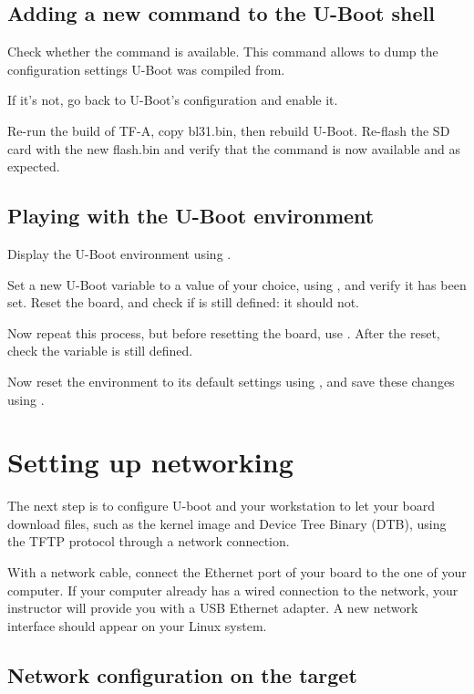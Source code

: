 \subsection{Adding a new command to the U-Boot shell}

Check whether the  command is available. This command
allows to dump the configuration settings U-Boot was compiled from.

If it's not, go back to U-Boot's configuration and enable it.

Re-run the build of TF-A, copy bl31.bin, then rebuild U-Boot. Re-flash the SD
card with the new flash.bin and verify that the command is now available and 
as expected.

\subsection{Playing with the U-Boot environment}

Display the U-Boot environment using .

Set a new U-Boot variable  to a value of your choice, using
, and verify it has been set. Reset the board, and check
if  is still defined: it should not.

Now repeat this process, but before resetting the board, use
. After the reset, check the  variable is
still defined.

Now reset the environment to its default settings using , and save these changes using .

\section{Setting up networking}

The next step is to configure U-boot and your workstation to let your
board download files, such as the kernel image and Device Tree Binary
(DTB), using the TFTP protocol through a network connection.

With a network cable, connect the Ethernet port of
your board to the one of your computer. If your computer already has a
wired connection to the network, your instructor will provide you with
a USB Ethernet adapter. A new network interface should appear on your
Linux system.

\subsection{Network configuration on the target}

